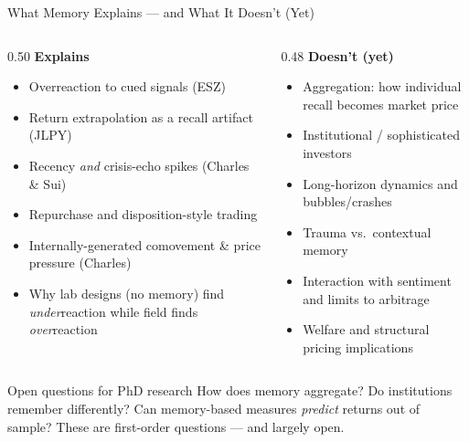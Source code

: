 \documentclass[aspectratio=169, 11pt]{beamer}
\begin{document}
\begin{frame}[shrink=5]{What Memory Explains --- and What It Doesn't (Yet)}
\begin{columns}[T]
\begin{column}{0.50\textwidth}
\textbf{Explains}
\begin{itemize}
\item Overreaction to cued signals (ESZ)
\item Return extrapolation as a recall artifact (JLPY)
\item Recency \emph{and} crisis-echo spikes (Charles \& Sui)
\item Repurchase and disposition-style trading
\item Internally-generated comovement \& price pressure (Charles)
\item Why lab designs (no memory) find \emph{under}reaction while field finds \emph{over}reaction
\end{itemize}
\end{column}
\begin{column}{0.48\textwidth}
\textbf{Doesn't (yet)}
\begin{itemize}
\item Aggregation: how individual recall becomes market price
\item Institutional / sophisticated investors
\item Long-horizon dynamics and bubbles/crashes
\item Trauma vs.\ contextual memory
\item Interaction with sentiment and limits to arbitrage
\item Welfare and structural pricing implications
\end{itemize}
\end{column}
\end{columns}
\vfill
\begin{alertblock}{Open questions for PhD research}
How does memory aggregate? Do institutions remember differently? Can memory-based measures \emph{predict} returns out of sample? These are first-order questions --- and largely open.
\end{alertblock}
\end{frame}
\end{document}
